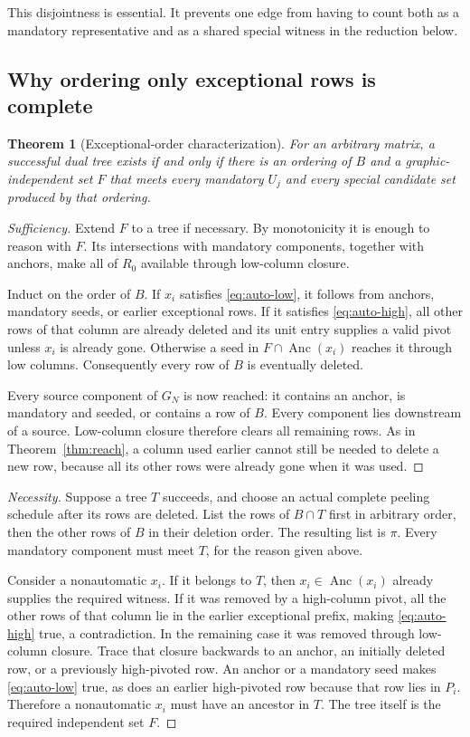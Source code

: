 \documentclass[11pt,letterpaper]{article}
\newtheorem{theorem}{Theorem}[section]
\theoremstyle{definition}
\theoremstyle{remark}
\DeclareMathOperator{\Anc}{Anc}
\begin{document}
This disjointness is essential. It prevents one edge from having to count both
as a mandatory representative and as a shared special witness in the reduction
below.

\subsection{Why ordering only exceptional rows is complete}
\begin{theorem}[Exceptional-order characterization]\label{thm:orders}
For an arbitrary matrix, a successful dual tree exists if and only if there is
an ordering of $B$ and a graphic-independent set $F$ that meets every mandatory
$U_j$ and every special candidate set produced by that ordering.
\end{theorem}
\begin{proof}[Sufficiency]
Extend $F$ to a tree if necessary. By monotonicity it is enough to reason with
$F$. Its intersections with mandatory components, together with anchors, make
all of $R_0$ available through low-column closure.

Induct on the order of $B$. If $x_i$ satisfies \eqref{eq:auto-low}, it follows
from anchors, mandatory seeds, or earlier exceptional rows. If it satisfies
\eqref{eq:auto-high}, all other rows of that column are already deleted and its
unit entry supplies a valid pivot unless $x_i$ is already gone. Otherwise a seed
in $F\cap\Anc(x_i)$ reaches it through low columns. Consequently every row of
$B$ is eventually deleted.

Every source component of $G_N$ is now reached: it contains an anchor, is
mandatory and seeded, or contains a row of $B$. Every component lies downstream
of a source. Low-column closure therefore clears all remaining rows. As in
Theorem~\ref{thm:reach}, a column used earlier cannot still be needed to delete a
new row, because all its other rows were already gone when it was used.
\end{proof}
\begin{proof}[Necessity]
Suppose a tree $T$ succeeds, and choose an actual complete peeling schedule after
its rows are deleted. List the rows of $B\cap T$ first in arbitrary order, then
the other rows of $B$ in their deletion order. The resulting list is $\pi$.
Every mandatory component must meet $T$, for the reason given above.

Consider a nonautomatic $x_i$. If it belongs to $T$, then $x_i\in\Anc(x_i)$
already supplies the required witness. If it was removed by a high-column pivot,
all the other rows of that column lie in the earlier exceptional prefix, making
\eqref{eq:auto-high} true, a contradiction. In the remaining case it was removed
through low-column closure. Trace that closure backwards to an anchor, an
initially deleted row, or a previously high-pivoted row. An anchor or a mandatory
seed makes \eqref{eq:auto-low} true, as does an earlier high-pivoted row because
that row lies in $P_i$. Therefore a nonautomatic $x_i$ must have an ancestor in
$T$. The tree itself is the required independent set $F$.
\end{proof}
\end{document}
